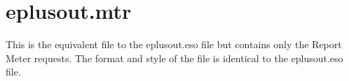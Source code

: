 \section{eplusout.mtr}

This is the equivalent file to the eplusout.eso file but contains only the Report Meter requests. The format and style of the file is identical to the eplusout.eso file.
